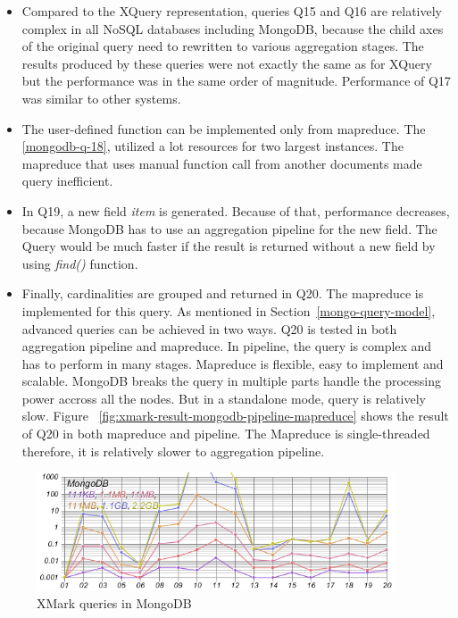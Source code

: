 \begin{itemize}
\item Compared to the XQuery representation, queries Q15 and Q16 are relatively complex in all NoSQL databases including MongoDB, because the child axes of the original query need to rewritten to various aggregation stages. The results produced by these queries were not exactly the same as for XQuery but the performance was in the same order of magnitude. Performance of Q17 was similar to other systems.

\item  The user-defined function can be implemented only from mapreduce. The \ref{mongodb-q-18}, utilized a lot resources for two largest instances. The mapreduce that uses manual function call from another documents made query inefficient. 

\item In Q19, a new field \textit{item} is generated. Because of that, performance decreases, because  MongoDB has to use an aggregation pipeline for the new field. The Query would be much faster if the result is returned without a new field by using \textit{find()} function.

\item Finally, cardinalities are grouped and returned in Q20. The mapreduce is implemented for this query. As mentioned in Section~\ref{mongo-query-model}, advanced queries can be achieved in two ways. Q20 is tested in both aggregation pipeline and mapreduce. In pipeline, the query is complex and has to perform in many stages. Mapreduce is flexible, easy to implement and scalable. MongoDB breaks the query in multiple parts handle the processing power accross all the nodes. But in a standalone mode, query is relatively slow. Figure ~\ref{fig:xmark-result-mongodb-pipeline-mapreduce} shows the result of Q20 in both mapreduce and pipeline. The Mapreduce is single-threaded therefore, it is relatively slower to aggregation pipeline.
\end{itemize}
\begin{figure}[hbt]
	\centering
	\includegraphics[width=0.95\textwidth]{img/result/mongodb/mongodb-all-18-20}
	\caption{XMark queries in MongoDB}
	\label{fig:xmark-result-mongodb-all}
	
\end{figure}	
